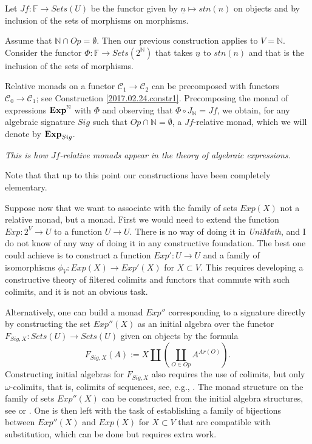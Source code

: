 \documentclass[12pt]{amsart}
\numberwithin{proposition}{subsection}
\newcommand{\sr}{\rightarrow}
\newcommand{\nn}{{\mathbb N}}
\newcommand{\nat}{\nn}
\newcommand{\uu}{\underline}
\newcommand{\C}{{\mathcal C}}
\newcommand{\FF}{{\mathbb F}}
\newcommand{\ff}[1]{\uu{#1}}
\begin{document}
Let $Jf:\FF\sr Sets(U)$ be the functor given by $\ff{n}\mapsto stn(n)$ on
objects and by inclusion of the sets of morphisms on morphisms.

Assume that $\nat\cap Op=\emptyset$. Then our previous construction applies to
$V=\nat$. Consider the functor $\Phi:\FF\sr Sets(2^{\nat})$ that takes $\ff{n}$
to $stn(n)$ and that is the inclusion of the sets of morphisms.

Relative monads on a functor $\C_1\sr \C_2$ can be precomposed with functors $\C_0\sr\C_1$; see Construction \ref{2017.02.24.constr1}. Precomposing the monad of expressions ${\bf Exp}^{\nat}$ with $\Phi$ and observing that $\Phi\circ J_{\nat}=Jf$, we obtain, for any algebraic signature $Sig$ such that $Op\cap \nat=\emptyset$, a $Jf$-relative monad, which we will denote by ${\bf Exp}_{Sig}$. 

{\em This is how $Jf$-relative monads appear in the theory of algebraic expressions.} 

Note that that up to this point our constructions have been completely elementary. 

Suppose now that we want to associate with the family of sets $Exp(X)$ not a
relative monad, but a monad. First we would need to extend the function
$Exp:2^V\sr U$ to a function $U\sr U$. There is no way of doing it in
{\em UniMath}, and I do not know of any way of doing it in any constructive
foundation. The best one could achieve is to construct a function $Exp':U\sr U$
and a family of isomorphisms $\phi_V:Exp(X)\sr Exp'(X)$ for $X\subset V$. This
requires developing a constructive theory of filtered colimits and functors
that commute with such colimits, and it is not an obvious task.

Alternatively, one can build a monad $Exp''$ corresponding to a signature
directly by constructing the set $Exp''(X)$ as an initial algebra over the
functor $F_{Sig,X}:Sets(U)\sr Sets(U)$ given on objects by the formula
%
$$F_{Sig,X}(A):=X\coprod(\coprod_{O\in Op}A^{Ar(O)}).$$
%
Constructing initial algebras for $F_{Sig,X}$ also requires the use of
colimits, but only $\omega$-colimits, that is, colimits of sequences, see,
e.g., \cite{Adamek1974}. The monad structure on the family of sets $Exp''(X)$
can be constructed from the initial algebra structures, see \cite{Barr1970} or
\cite[Th.3, p.~161]{MatthesUustalu}. One is then left with the task of
establishing a family of bijections between $Exp''(X)$ and $Exp(X)$ for
$X\subset V$ that are compatible with substitution, which can be done but
requires extra work.
\end{document}
